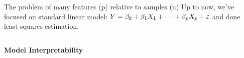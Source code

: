 \documentclass[aspectratio=169,usenames,dvipsnames]{beamer}
\newcommand{\InstructorNotes}[1]{\textit{\color{orange}#1}}
\newcommand{\InstructorList}[1]{
\begin{itemize}
	\color{orange}
	#1
\end{itemize}
}
\renewcommand{\InstructorNotes}[1]{}
\renewcommand{\InstructorList}[1]{}
\begin{document}
\begin{frame}[t]{The problem of many features (p) relative to samples (n)}
	Up to now, we've focused on standard linear model:
		$Y = \beta_0 + \beta_1 X_1 + \cdots + \beta_p X_p + \varepsilon$
	and done least squares estimation.
	\InstructorNotes{Translation: Minimize $RSS = \sum_{i}(y_i-\hat y_i)^2$}
\begin{columns}
	\centering


\textbf{Model Interpretability}
\footnotesize
\InstructorList{
\item Often, many variables included aren't associated with response
\item Including them leads to unnecessary complexity in the model
\item Idea: Set these coefficients to 0 (or close to zero)
\item Goal on next slide: Do some automatic feature selection / variable selection to get rid of unnecessary variables
}
\centering
\end{columns}

\end{frame}





\end{document}
